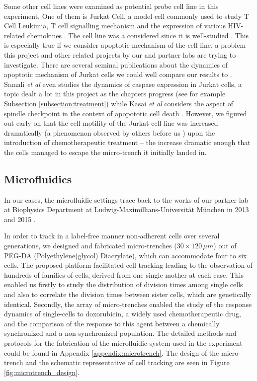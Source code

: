 \documentclass[pdftex,12pt,a4paper]{report}
\begin{document}
Some other cell lines were examined as potential probe cell line in this experiment. One of them is Jurkat Cell, a model cell commonly used to study T Cell Leukimia, T cell signalling mechanism and the expression of various HIV-related chemokines \cite{schneider1977characterization}. The cell line was a considered since it is well-studied \cite{johnson2007genome, schena1996parallel}. This is especially true if we consider apoptotic mechanism of the cell line, a problem this project and other related projects by our  and partner labs are trying to investigate. There are several seminal publications about the dynamics of apoptotic mechanism of Jurkat cells we could well compare our results to \cite{gottlieb1996apoptosis}. Samali \textit{et al} \cite{samali1999presence} even studies the dynamics of caspase expression in Jurkat cells, a topic dealt a lot in this project as the chapters progress (see for example Subsection \ref{subsection:treatment}) while Kasai \textit{et al} considers the aspect of spindle checkpoint in the context of apopototic cell death \cite{kasai2002prevalent}. However, we figured out early on that the cell motility of the Jurkat cell line was increased dramatically (a phenomenon observed by others before us \cite{barnhart2004cd95}) upon the introduction of chemotherapeutic treatment -- the increase dramatic enough that the cells managed to escape the micro-trench it initially landed in.


\subsection{Microfluidics}
\label{subsection:microfluid_env}


In our cases, the microfluidic settings trace back to the works of our partner lab at Biophysics Department at Ludwig-Maximillians-Universit\"at M\"unchen in 2013 \cite{marel2013arraying} and 2015 \cite{sekhavati2015marker, sekhavati2015dynamic}.

In order to track in a label-free manner non-adherent cells over several generations, we designed and fabricated micro-trenches ($30 \times 120 \, \mu m$) out of PEG-DA (Polyethylene(glycol) Diacrylate), which can accommodate four to six cells. The proposed platform facilitated cell tracking leading to the observation of hundreds of families of cells, derived from one single mother at each case. This enabled us firstly to study the distribution of division times among single cells and also to correlate the division times between sister cells, which are genetically identical. Secondly, the array of micro-trenches enabled the study of the response dynamics of single-cells to doxorubicin, a widely used chemotherapeutic drug, and the comparison of the response to this agent between a chemically synchronized and a non-synchronized population. The detailed methods and protocols for the fabrication of the microfluidic system used in the experiment could be found in Appendix \ref{appendix:microtrench}. The design of the micro-trench and the schematic representative of cell tracking are seen in Figure \ref{fig:microtrench_design}.
\end{document}
